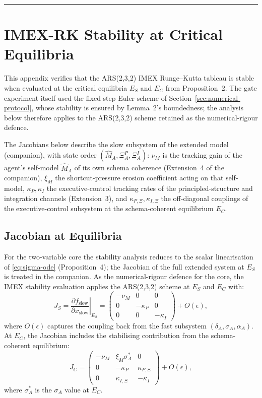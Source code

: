\documentclass{article}
\theoremstyle{definition}
\begin{document}
\noindent\rule{\linewidth}{0.4pt}

\section{IMEX-RK Stability at Critical Equilibria}\label{app:stability}

This appendix verifies that the ARS(2,3,2) IMEX Runge--Kutta tableau
is stable when evaluated at the
critical equilibria $E_S$ and $E_C$ from Proposition~2. The gate
experiment itself used the fixed-step Euler scheme of
Section~\ref{sec:numerical-protocol}, whose stability is ensured by
Lemma~2's boundedness; the analysis below therefore applies to the
ARS(2,3,2) scheme retained as the numerical-rigour defence.

The Jacobians below describe the slow subsystem of the extended model
(companion), with state order $(\hat{M}_A, \Xi_A^P, \Xi_A^I)$:
$\nu_M$ is the tracking gain of the agent's self-model $\hat{M}_A$ of
its own schema coherence (Extension~4 of the companion), $\xi_M$ the
shortcut-pressure erosion coefficient acting on that self-model,
$\kappa_P, \kappa_I$ the executive-control tracking rates of the
principled-structure and integration channels (Extension~3), and
$\kappa_{P,\Xi}, \kappa_{I,\Xi}$ the off-diagonal couplings of the
executive-control subsystem at the schema-coherent equilibrium
$E_C$.

\subsection{Jacobian at Equilibria}

For the two-variable core the stability analysis reduces to the scalar
linearisation of \eqref{eq:sigma-ode} (Proposition~4); the Jacobian of
the full extended system at $E_S$ is treated in the companion. As the
numerical-rigour defence for the core, the IMEX stability evaluation
applies the ARS(2,3,2) scheme at $E_S$ and $E_C$ with:
\begin{equation}
J_S = \left.\frac{\partial f_{\text{slow}}}{\partial x_{\text{slow}}}\right|_{E_S}
= \begin{pmatrix}
-\nu_M & 0 & 0 \\
0 & -\kappa_P & 0 \\
0 & 0 & -\kappa_I
\end{pmatrix} + O(\epsilon),
\end{equation}
where $O(\epsilon)$ captures the coupling back from the fast subsystem
$(\delta_A, \sigma_A, \alpha_A)$. At $E_C$, the Jacobian includes
the stabilising contribution from the schema-coherent equilibrium:
\begin{equation}
J_C = \begin{pmatrix}
-\nu_M & \xi_M \sigma_A^* & 0 \\
0 & -\kappa_P & \kappa_{P,\Xi} \\
0 & \kappa_{I,\Xi} & -\kappa_I
\end{pmatrix} + O(\epsilon),
\end{equation}
where $\sigma_A^*$ is the $\sigma_A$ value at $E_C$.
\end{document}
